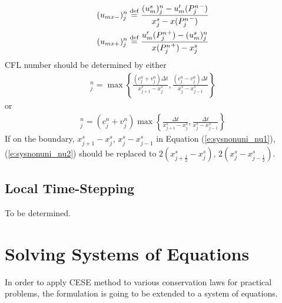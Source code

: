 \documentclass{turgon}
\begin{document}
\begin{align}
  (u_{mx-})_j^n &\defeq
    \frac{(u_m^s)_j^n-u_m'({P_j^n}^-)}{x_j^s-x({P_j^n}^-)} \\
  (u_{mx+})_j^n &\defeq
    \frac{u_m'({P_j^n}^+)-(u_m^s)_j^n}{x({P_j^n}^+)-x_j^s}
\end{align}
\citep[See also][Eq.~(6.44), (6.45)]{chang_not_2008}  CFL number should be
determined by either
\begin{align}
  [\nu^{(1)}]_j^n =
    \max\left\{
      \frac{(c_j^n+v_j^n)\Delta t}{x_{j+1}^s-x_j^s},
      \frac{(c_j^n-v_j^n)\Delta t}{x_j^s-x_{j-1}^s}
    \right\} \label{e:sysnonuni_nu1}
\end{align}
or
\begin{align}
  [\nu^{(2)}]_j^n =
    (c_j^n+v_j^n)\max\left\{
      \frac{\Delta t}{x_{j+1}^s-x_j^s},
      \frac{\Delta t}{x_j^s-x_{j-1}^s}
    \right\} \label{e:sysnonuni_nu2}
\end{align}
If on the boundary, $x_{j+1}^s-x_j^s$, $x_j^s-x_{j-1}^s$ in Equation
(\ref{e:sysnonuni_nu1}), (\ref{e:sysnonuni_nu2}) should be replaced to
$2(x_{j+\frac{1}{2}}^s-x_j^s)$, $2(x_j^s-x_{j-\frac{1}{2}}^s)$.  \citep[See
also][Eq.~(6.62), (6.64)]{chang_not_2008}

\section{Local Time-Stepping}
\label{s:lts}

To be determined.

\chapter{Solving Systems of Equations}
\label{c:system_eqn}

In order to apply CESE method to various conservation laws for practical
problems, the formulation is going to be extended to a system of equations.
\end{document}
